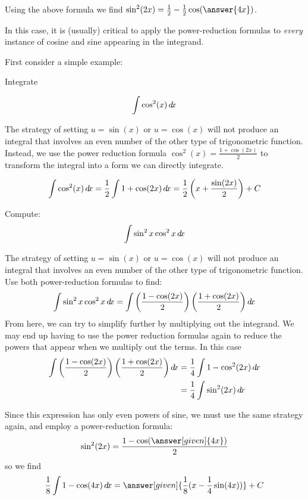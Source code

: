 \documentclass{ximera}
\begin{document}
\begin{question}
Using the above formula we find $\sin^2(2x) = \frac{1}{2}-\frac{1}{2} \cos(\answer{4x})$.
\end{question}

In this case, it is (usually) critical to apply the power-reduction
formulas to \textit{every} instance of cosine and sine appearing in
the integrand.

First consider a simple example:

\begin{example}
Integrate 

\[ 
\int \cos^{2}(x) \mathop{}\!d\! x
\]

\begin{explanation}
The strategy of setting $u=\sin(x)$ or $u=\cos(x)$ will not produce an integral that involves an even number of the other type of trigonometric function.  Instead, we use the power reduction formula $\cos^{2}(x)=\frac{1+\cos(2x)}{2}$ to transform the integral into a form we can directly integrate.

\[
\int \cos^{2} (x) \mathop{}\!d\! x= \frac{1}{2} \int 1+\cos(2x) \mathop{}\!d\! x = \frac{1}{2} \left( x+ \frac{ \sin(2x)}{2} \right) + C
\]


\end{explanation}
\end{example}


\begin{example}
  Compute:
  \[
  \int \sin^2x\cos^2x\mathop{}\!d\! x
  \]
  \begin{explanation} 
    The strategy of setting $u=\sin(x)$ or $u=\cos(x)$ will not produce an integral that involves an even number of the other type of trigonometric function. Use both power-reduction formulas to find:
    \[
    \int \sin^2x\cos^2x\mathop{}\!d\! x=\int \left( \frac{1-\cos(2x)}{2}\right)
    \left(\frac{1+\cos(2x)}{2}\right) \mathop{}\!d\! x
    \]
    From here, we can try to simplify further by multiplying out the integrand. We may end up having to
    use the power reduction formulas again to reduce the powers that appear when we multiply out the terms.  In this case
    \begin{align*}
      \int \left(\frac{1-\cos(2x)}{2}\right) \left( \frac{1+\cos(2x)}{2}\right) \mathop{}\!d\! x &= \frac{1}{4} \int 1-\cos^2(2x) \mathop{}\!d\! x\\
      &= \frac{1}{4} \int \sin^2(2x) \mathop{}\!d\! x
    \end{align*}
    
    Since this expression has only even powers of sine, we must use
    the same strategy again, and employ a power-reduction formula:
    \[
    \sin^2(2x) = \frac{1-\cos(\answer[given]{4x})}{2}
    \]
    so we find
    \[
    \frac{1}{8}\int 1-\cos(4x) \d x = \answer[given]{\frac{1}{8}(x - \frac{1}{4}\sin(4x))} + C
    \]
  \end{explanation}
\end{example}
\end{document}
